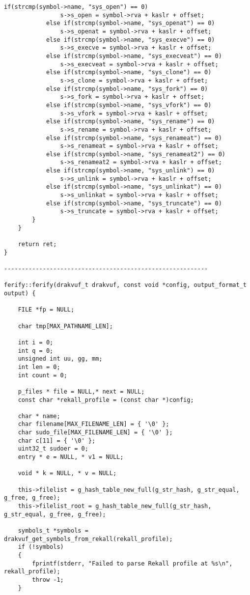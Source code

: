 {\begin{lstlisting}[style=CStyle]
			if(strcmp(symbol->name, "sys_open") == 0)
				s->s_open = symbol->rva + kaslr + offset;
			else if(strcmp(symbol->name, "sys_openat") == 0)
				s->s_openat = symbol->rva + kaslr + offset;
			else if(strcmp(symbol->name, "sys_execve") == 0)
				s->s_execve = symbol->rva + kaslr + offset;
			else if(strcmp(symbol->name, "sys_execveat") == 0)
				s->s_execveat = symbol->rva + kaslr + offset;
			else if(strcmp(symbol->name, "sys_clone") == 0)
				s->s_clone = symbol->rva + kaslr + offset;
			else if(strcmp(symbol->name, "sys_fork") == 0)
				s->s_fork = symbol->rva + kaslr + offset;
			else if(strcmp(symbol->name, "sys_vfork") == 0)
				s->s_vfork = symbol->rva + kaslr + offset;
			else if(strcmp(symbol->name, "sys_rename") == 0)
				s->s_rename = symbol->rva + kaslr + offset;
			else if(strcmp(symbol->name, "sys_renameat") == 0)
				s->s_renameat = symbol->rva + kaslr + offset;
			else if(strcmp(symbol->name, "sys_renameat2") == 0)
				s->s_renameat2 = symbol->rva + kaslr + offset;
			else if(strcmp(symbol->name, "sys_unlink") == 0)
				s->s_unlink = symbol->rva + kaslr + offset;
			else if(strcmp(symbol->name, "sys_unlinkat") == 0)
				s->s_unlinkat = symbol->rva + kaslr + offset;
			else if(strcmp(symbol->name, "sys_truncate") == 0)
				s->s_truncate = symbol->rva + kaslr + offset;
		}
	}
	
	return ret;
}

----------------------------------------------------------

ferify::ferify(drakvuf_t drakvuf, const void *config, output_format_t output) {

	FILE *fp = NULL;
	
	char tmp[MAX_PATHNAME_LEN];
	
	int i = 0;
	int q = 0;
	unsigned int uu, gg, mm;
	int len = 0;
	int count = 0;
	
	p_files * file = NULL,* next = NULL;
	const char *rekall_profile = (const char *)config;
	
	char * name;
	char filename[MAX_FILENAME_LEN] = { '\0' };
	char sudo_file[MAX_FILENAME_LEN] = { '\0' };
	char c[11] = { '\0' };
	uint32_t sudoer = 0;
	entry * e = NULL, * v1 = NULL;
	
	void * k = NULL, * v = NULL;
	
	this->filelist = g_hash_table_new_full(g_str_hash, g_str_equal, g_free, g_free);
	this->filelist_root = g_hash_table_new_full(g_str_hash, g_str_equal, g_free, g_free);
	
	symbols_t *symbols = drakvuf_get_symbols_from_rekall(rekall_profile);
	if (!symbols)
	{
		fprintf(stderr, "Failed to parse Rekall profile at %s\n", rekall_profile);
		throw -1;
	}
	

\end{lstlisting}}

